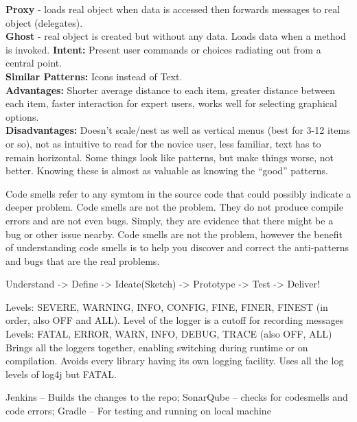 \documentclass[number]{assignment}
\begin{document}
\begin{landscape}
\begin{multicols}{3}
\small\textbf{Proxy} - loads real object when data is accessed then forwards messages to real object (delegates).\\
\small\textbf{Ghost} - real object is created but without any data. Loads data when a method is invoked.
\small\textbf{Intent:} Present user commands or choices radiating out from a central point.\\
\small\textbf{Similar Patterns:} Icons instead of Text.\\
\small\textbf{Advantages:} Shorter average distance to each item, greater distance between each item, faster interaction for expert users, works well for selecting graphical options.\\
\small\textbf{Disadvantages:} Doesn't scale/nest as well as vertical menus (best for 3-12 items or so), not as intuitive to read for the novice user, less familiar, text has to remain horizontal.
\small Some things look like patterns, but make things worse, not better. Knowing these is almost as valuable as knowing the ``good'' patterns.

\small Code smells refer to any symtom in the source code that could possibly indicate a deeper problem. Code smells are not the problem. They do not produce compile errors and are not even bugs. Simply, they are evidence that there might be a bug or other issue nearby.
\small Code smells are not the problem, however the benefit of understanding code smells is to help you discover and correct the anti-patterns and bugs that are the real problems.

\small Understand -> Define -> Ideate(Sketch) -> Prototype -> Test -> Deliver!


\small Levels: SEVERE, WARNING, INFO, CONFIG, FINE, FINER, FINEST (in order, also OFF and ALL). Level of the logger is a cutoff for recording messages
\small Levels: FATAL, ERROR, WARN, INFO, DEBUG, TRACE (also OFF, ALL)
\small Brings all the loggers together, enabling switching during runtime or on compilation. Avoids every library having its own logging facility. Uses all the log levels of log4j but FATAL.

\small Jenkins -- Builds the changes to the repo; SonarQube -- checks for codesmells and code errors; Gradle -- For testing and running on local machine\\


\end{multicols}
\end{landscape}
\end{document}
